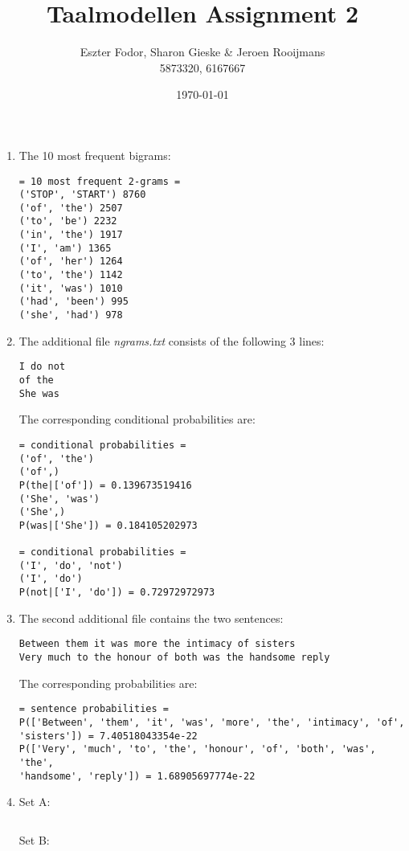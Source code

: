 \documentclass[11pt, a4paper]{article}
\title{Taalmodellen Assignment 2}
\author{Eszter Fodor, Sharon Gieske \& Jeroen Rooijmans \\ 5873320, 6167667}
\date{\today}
\begin{document}
\maketitle

\begin{enumerate}
	\item The 10 most frequent bigrams:
\begin{verbatim}
= 10 most frequent 2-grams =
('STOP', 'START') 8760
('of', 'the') 2507
('to', 'be') 2232
('in', 'the') 1917
('I', 'am') 1365
('of', 'her') 1264
('to', 'the') 1142
('it', 'was') 1010
('had', 'been') 995
('she', 'had') 978
\end{verbatim}

\item The additional file \textit{ngrams.txt} consists of the following 3 lines:
\begin{verbatim}
I do not
of the
She was
\end{verbatim}
The corresponding conditional probabilities are:
\begin{verbatim}
= conditional probabilities =
('of', 'the')
('of',)
P(the|['of']) = 0.139673519416 
('She', 'was')
('She',)
P(was|['She']) = 0.184105202973 

= conditional probabilities =
('I', 'do', 'not')
('I', 'do')
P(not|['I', 'do']) = 0.72972972973
\end{verbatim}

\newpage{}

\item The second additional file contains the two sentences:
\begin{verbatim}
Between them it was more the intimacy of sisters
Very much to the honour of both was the handsome reply
\end{verbatim}
The corresponding probabilities are:
\begin{verbatim}
= sentence probabilities =
P(['Between', 'them', 'it', 'was', 'more', 'the', 'intimacy', 'of', 
'sisters']) = 7.40518043354e-22 
P(['Very', 'much', 'to', 'the', 'honour', 'of', 'both', 'was', 'the', 
'handsome', 'reply']) = 1.68905697774e-22
\end{verbatim}

\item Set A:
\begin{verbatim}

\end{verbatim}

Set B:
\begin{verbatim}

\end{verbatim}

\end{enumerate}
\end{document}
